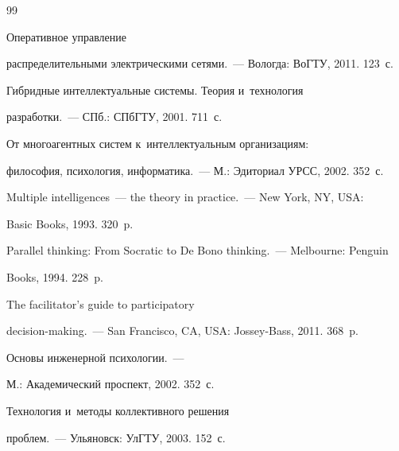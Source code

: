   


{\small\frenchspacing


{%




\begin{thebibliography}{99}




   Оперативное управление 


распределительными электрическими сетями.~--- Вологда: ВоГТУ, 2011. 123~с.




   Гибридные интеллектуальные системы. Теория и~технология 


разработки.~--- СПб.: СПбГТУ, 2001. 711~с.




   От многоагентных систем к~интеллектуальным организациям: 


философия, психология, информатика.~--- М.: Эдиториал УРСС, 2002. 352~с.




   Multiple intelligences~--- the theory in practice.~--- New York, NY, USA: 


Basic Books, 1993. 320~p.


  




   Parallel thinking: From Socratic to De Bono thinking.~--- Melbourne: Penguin 


Books, 1994. 228~p.




   The facilitator's guide to participatory 


decision-making.~--- San Francisco, CA, USA: Jossey-Bass, 2011. 368~p.




   Основы инженерной психологии.~--- 


М.: Академический проспект, 2002. 352~с.




 Технология и~методы коллективного решения 


проблем.~--- Ульяновск: УлГТУ, 2003. 152~с.



\end{thebibliography}}}
